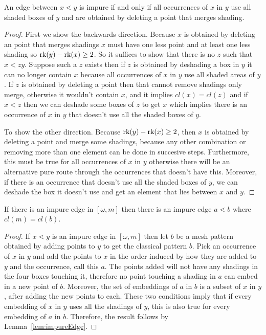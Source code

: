 \documentclass[11pt,a4paper,oneside]{article}
\begin{document}
\begin{lem}\label{lem:impureEdge}
An edge between $x\lessdot y$ is impure if and only if all occurrences of $x$ in $y$ use all shaded boxes of $y$ and are obtained by deleting a point that merges shading.
\begin{proof}
First we show the backwards direction. Because $x$ is obtained by deleting an point that merges shadings $x$ must have one less point and at least one less shading so $\operatorname{\textrm{rk}}(y)-\operatorname{\textrm{rk}}(x)\ge2$. So it suffices to show that there is no $z$ such that $x<z y$. Suppose such a $z$ exists then if $z$ is obtained by deshading a box in $y$ it can no longer contain $x$ because all occurrences of $x$ in $y$ use all shaded areas of $y$. If $z$ is obtained by deleting a point then that cannot remove shadings only merge, otherwise it wouldn't contain $x$, and it implies $cl(x)=cl(z)$ and if $x<z$ then we can deshade some boxes of $z$ to get $x$ which implies there is an occurrence of $x$ in $y$ that doesn't use all the shaded boxes of $y$.

To show the other direction. Because $\operatorname{\textrm{rk}}(y)-\operatorname{\textrm{rk}}(x)\ge2$, then $x$ is obtained by deleting a point and merge some shadings, because any other combination or removing more than one element can be done in succesive steps. Furthermore, this must be true for all occurrences of $x$ in $y$ otherwise there will be an alternative pure route through the occurrences that doesn't have this. Moreover, if there is an occurrence that doesn't use all the shaded boxes of $y$, we can deshade the box it doesn't use and get an element that lies between $x$ and $y$.
\end{proof} 
\end{lem}

\begin{lem}\label{lem:topImpure}
If there is an impure edge in $[\omega,m]$ then there is an impure edge $a\lessdot b$ where $cl(m)=cl(b)$.
\begin{proof}
If $x\lessdot y$ is an impure edge in $[\omega,m]$ then let $b$ be a mesh pattern obtained by adding points to $y$ to get the classical pattern $b$. Pick an occurrence of $x$ in $y$ and add the points to $x$ in the order induced by how they are added to $y$ and the occurrence, call this $a$. The points added will not have any shadings in the four boxes touching it, therefore no point touching a shading in $a$ can embed in a new point of $b$. Moreover, the set of embeddings of $a$ in $b$ is a subset of $x$ in $y$, after adding the new points to each. These two conditions imply that if every embedding of $x$ in $y$ uses all the shadings of $y$, this is also true for every embedding of $a$ in $b$. Therefore, the result follows by Lemma~\ref{lem:impureEdge}.
\end{proof}
\end{lem}
\end{document}
